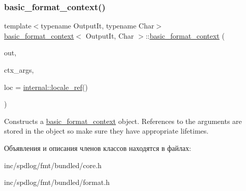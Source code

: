 \subsubsection{\texorpdfstring{basic\+\_\+format\+\_\+context()}{basic\_format\_context()}}
{\footnotesize\ttfamily template$<$typename Output\+It, typename Char$>$ \\
\hyperlink{classbasic__format__context}{basic\+\_\+format\+\_\+context}$<$ Output\+It, Char $>$\+::\hyperlink{classbasic__format__context}{basic\+\_\+format\+\_\+context} (\begin{DoxyParamCaption}\item[{Output\+It}]{out,  }\item[{\hyperlink{classbasic__format__args}{basic\+\_\+format\+\_\+args}$<$ \hyperlink{classbasic__format__context}{basic\+\_\+format\+\_\+context}$<$ Output\+It, Char $>$ $>$}]{ctx\+\_\+args,  }\item[{\hyperlink{classinternal_1_1locale__ref}{internal\+::locale\+\_\+ref}}]{loc = {\ttfamily \hyperlink{classinternal_1_1locale__ref}{internal\+::locale\+\_\+ref}()} }\end{DoxyParamCaption})\hspace{0.3cm}{\ttfamily [inline]}}

Constructs a {\ttfamily \hyperlink{classbasic__format__context}{basic\+\_\+format\+\_\+context}} object. References to the arguments are stored in the object so make sure they have appropriate lifetimes. 

Объявления и описания членов классов находятся в файлах\+:\begin{DoxyCompactItemize}
\item 
inc/spdlog/fmt/bundled/core.\+h\item 
inc/spdlog/fmt/bundled/format.\+h\end{DoxyCompactItemize}

